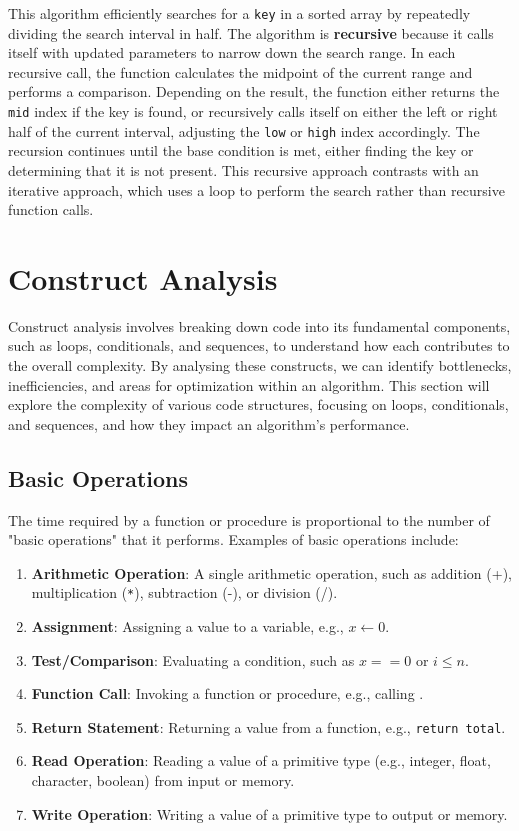 This algorithm efficiently searches for a \texttt{key} in a sorted array by repeatedly dividing the search interval in half. The algorithm is \textbf{recursive} because it calls itself with updated parameters to narrow down the search range. In each recursive call, the function calculates the midpoint of the current range and performs a comparison. Depending on the result, the function either returns the \texttt{mid} index if the key is found, or recursively calls itself on either the left or right half of the current interval, adjusting the \texttt{low} or \texttt{high} index accordingly. The recursion continues until the base condition is met, either finding the key or determining that it is not present. This recursive approach contrasts with an iterative approach, which uses a loop to perform the search rather than recursive function calls.

\section{Construct Analysis}\label{sec:ch11-2}
Construct analysis involves breaking down code into its fundamental components, such as loops, conditionals, and sequences, to understand how each contributes to the overall complexity. By analysing these constructs, we can identify bottlenecks, inefficiencies, and areas for optimization within an algorithm. This section will explore the complexity of various code structures, focusing on loops, conditionals, and sequences, and how they impact an algorithm's performance.

\subsection*{Basic Operations}
The time required by a function or procedure is proportional to the number of "basic operations" that it performs. Examples of basic operations include:

\begin{enumerate}
    \item \textbf{Arithmetic Operation}: A single arithmetic operation, such as addition (+), multiplication (\texttt{*}), subtraction (-), or division (/).
    \item \textbf{Assignment}: Assigning a value to a variable, e.g., $x \gets 0$.
    \item \textbf{Test/Comparison}: Evaluating a condition, such as $x == 0$ or $i \leq n$.
    \item \textbf{Function Call}: Invoking a function or procedure, e.g., calling .
    \item \textbf{Return Statement}: Returning a value from a function, e.g., \texttt{return total}.
    \item \textbf{Read Operation}: Reading a value of a primitive type (e.g., integer, float, character, boolean) from input or memory.
    \item \textbf{Write Operation}: Writing a value of a primitive type to output or memory.
\end{enumerate}

